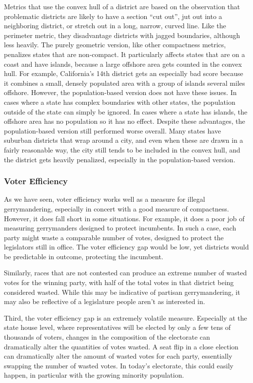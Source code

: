 \documentclass[12pt]{article}
\begin{document}
  Metrics that use the convex hull of a district are based on the observation that problematic districts are likely to have a section ``cut out'', jut out into a neighboring district, or stretch out in a long, narrow, curved line. Like the perimeter metric, they disadvantage districts with jagged boundaries, although less heavily. The purely geometric version, like other compactness metrics, penalizes states that are non-compact. It particularly affects states that are on a coast and have islands, because a large offshore area gets counted in the convex hull. For example, California's 14th district gets an especially bad score because it combines a small, densely populated area with a group of islands several miles offshore. However, the population-based version does not have these issues. In cases where a state has complex boundaries with other states, the population outside of the state can simply be ignored. In cases where a state has islands, the offshore area has no population so it has no effect. Despite these advantages, the population-based version still performed worse overall. Many states have suburban districts that wrap around a city, and even when these are drawn in a fairly reasonable way, the city still tends to be included in the convex hull, and the district gets heavily penalized, especially in the population-based version.

  \subsubsection{Voter Efficiency}
  As we have seen, voter efficiency works well as a measure for illegal gerrymandering, especially in concert with a good measure of compactness.  However, it does fall short in some situations.  For example, it does a poor job of measuring gerrymanders designed to protect incumbents.  In such a case, each party might waste a comparable number of votes, designed to protect the legislators still in office.  The voter efficiency gap would be low, yet districts would be predictable in outcome, protecting the incumbent.

  Similarly, races that are not contested can produce an extreme number of wasted votes for the winning party, with half of the total votes in that district being considered wasted.  While this may be indicative of partisan gerrymandering, it may also be reflective of a legislature people aren't as interested in.

  Third, the voter efficiency gap is an extremely volatile measure.  Especially at the state house level, where representatives will be elected by only a few tens of thousands of voters, changes in the composition of the electorate can dramatically alter the quantities of votes wasted.  A seat flip in a close election can dramatically alter the amount of wasted votes for each party, essentially swapping the number of wasted votes.  In today's electorate, this could easily happen, in particular with the growing minority population.
\end{document}
